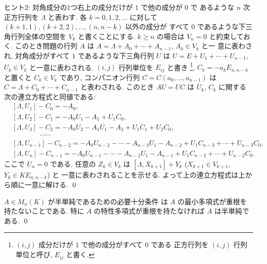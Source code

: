 \documentclass[12pt,twoside]{jarticle}
\begin{document}
\medskip
\noindent
ヒント2: 対角成分の1つ右上の成分だけが $1$ で他の成分が $0$ で
あるような $n$ 次正方行列を $\Lambda$ と表わす.
各 $k=0,1,2,\dots$ に対して $(k+1,1),(k+2,2),\dots,(n,n-k)$ 以外の成分が
すべて $0$ であるような下三角行列全体の空間を $V_k$ と書くことにする.
$k\ge n$ の場合は $V_n=0$ と約束しておく.
このとき問題の行列 $A$ は $A=\Lambda+A_0+\cdots+A_{n-1}$, $A_k\in V_k$ と一
意に表わされ, 対角成分がすべて $1$ であるような下三角行列 $U$ 
は $U=E+U_1+\cdots+U_{n-1}$, $U_k\in V_k$ と一意に表わされる.
$(i,j)$ 行列単位を $E_{ij}$ と書き%
\footnote{$(i,j)$ 成分だけが $1$ で他の成分がすべて $0$ である
  正方行列を $(i,j)$ 行列単位と呼び, $E_{ij}$ と書く.}, 
$C_k = -a_kE_{n,n-k}$ と置くと $C_k\in V_k$ であり,
コンパニオン行列 $C=C(a_0,\dots,a_{n-1})$ 
は $C = \Lambda+C_0+\cdots+C_{n-1}$ と表わされる.
このとき $AU=UC$ は $U_k$, $C_k$ に関する次の連立方程式と同値である:
\begin{align*}
  &
  [\Lambda, U_1] - C_0 
  = - A_0,
  \\ &
  [\Lambda, U_2] - C_1 
  = - A_0U_1 - A_1 + U_1C_0,
  \\ &
  [\Lambda, U_3] - C_2 
  = - A_0U_2 - A_1U_1 - A_2 + U_1C_1 + U_2C_0,
  \\ &
  \qquad\qquad\cdots\cdots
  \\ &
  [\Lambda, U_{n-1}] - C_{n-2} 
  = - A_0U_{n-2} - \cdots - A_{n-3}U_1 - A_{n-2} 
  + U_1C_{n-3} + \cdots + U_{n-3}C_0,
  \\ &
  [\Lambda, U_n] - C_{n-1}
  = - A_0U_{n-1} - \cdots - A_{n-2}U_1 - A_{n-1} 
  + U_1C_{n-2} + \cdots + U_{n-2}C_0.
\end{align*}
ここで $U_n=0$ である. 
任意の $Z_k\in V_k$ は $[\Lambda, X_{k+1}] + Y_k$ 
($X_{k+1}\in V_{k+1}$, $Y_k \in K E_{n,n-k}$) と
一意に表わされることを示せる.  
よって上の連立方程式は上から順に一意に解ける.
\qed


\begin{question}[最小多項式による半単純性の判定法]
\label{q:minimal-polyn-semisimple}
  $A\in M_n(K)$ が半単純であるための必要十分条件
  は $A$ の最小多項式が重根を持たないことである.
  特に $A$ の特性多項式が重根を持たなければ $A$ は半単純である.
  \qed
\end{question}
\end{document}
